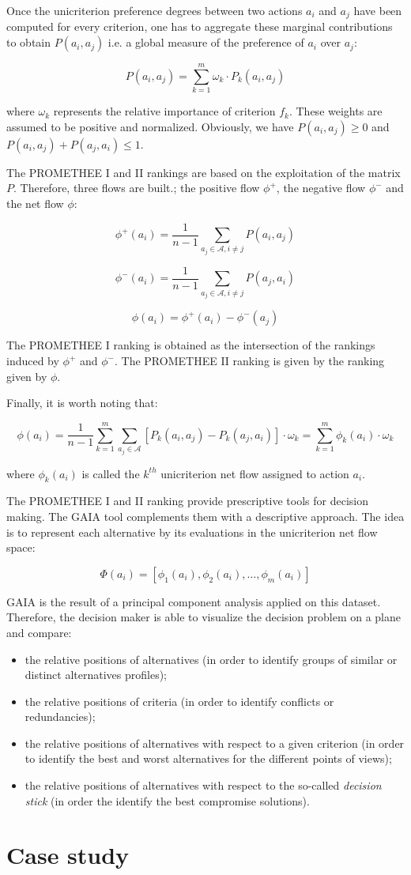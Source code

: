 \documentclass{svmono}
\begin{document}
Once the unicriterion preference degrees between two actions $a_i$ and $a_j$ have been computed for every criterion, one has to aggregate these marginal contributions to obtain $P(a_i,a_j)$  i.e. a global measure of the preference of $a_i$ over $a_j$:

$$
P(a_i,a_j)= \sum_{k=1}^{m} \omega_k \cdot P_k(a_i,a_j)
$$

where $\omega_k$ represents the relative importance of criterion $f_k$. These weights are assumed to be positive and normalized. Obviously, we have $P(a_i,a_j) \geq 0$ and $P(a_i,a_j) + P(a_j,a_i) \leq 1$.\

The PROMETHEE I and II rankings are based on the exploitation of the matrix $P$. Therefore, three flows are built.; the positive flow $\phi^+$, the negative flow $\phi^-$ and the net flow $\phi$:

$$
\phi^+(a_i)= \frac{1}{n-1} \sum_{a_j \in \mathcal{A}, i \ne j}
P(a_i,a_j)
$$

$$
\phi^-(a_i)= \frac{1}{n-1} \sum_{a_j \in \mathcal{A}, i \ne j}
P(a_j,a_i)
$$

$$
\phi(a_i)=\phi^+(a_i)-\phi^-(a_j)
$$

The PROMETHEE I ranking is obtained as the intersection of the rankings induced by $\phi^+$ and $\phi^-$. The PROMETHEE II ranking is given by the ranking given by $\phi$.

Finally, it is worth noting that:

$$
\phi(a_i) = \frac{1}{n-1} \sum_{k=1}^{m} \sum_{a_j \in \mathcal{A}} {[P_k(a_i,a_j)-P_k(a_j,a_i)]} \cdot \omega_k = \sum_{k=1}^{m} \phi_k(a_i) \cdot \omega_k
$$

where $\phi_k(a_i)$ is called the $k^{th}$ unicriterion net flow assigned to action $a_i$.

The PROMETHEE I and II ranking provide prescriptive tools for decision making. The GAIA \cite{MarBra1988} tool complements them with a descriptive approach. The idea is to represent each alternative by its evaluations in the unicriterion net flow space:

$$
\Phi(a_i)=[\phi_1(a_i),\phi_2(a_i),\ldots,\phi_m(a_i)]
$$

GAIA is the result of a principal component analysis applied on this dataset. Therefore, the decision maker is able to visualize the decision problem on a plane and compare:
\begin{itemize}
\item the relative positions of alternatives (in order to identify groups of similar or distinct alternatives profiles);
\item the relative positions of criteria (in order to identify conflicts or redundancies);
\item the relative positions of alternatives with respect to a given criterion (in order to identify the best and worst alternatives for the different points of views);
\item the relative positions of alternatives with respect to the so-called \textit{decision stick} (in order the identify the best compromise solutions).
\end{itemize}

\section{Case study}



\end{document}
